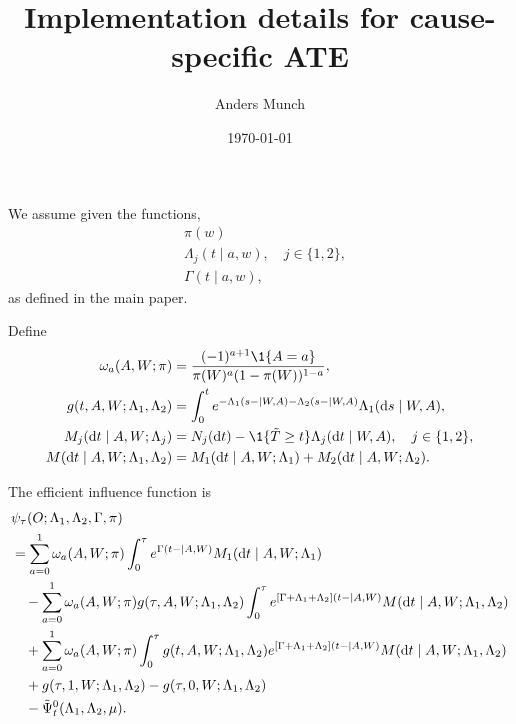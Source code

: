 \documentclass[a4,danish]{article}
\title{Implementation details for cause-specific ATE}
\author{Anders Munch}
\date{\today}
\begin{document}
\maketitle

We assume given the functions,
\begin{align*}
  & \pi(w)
  \\
  & \Lambda_j(t \mid a, w), \quad j \in \{1,2\},
  \\
  & \Gamma(t \mid a, w),
\end{align*}
as defined in the main paper.

Define
\begin{align*}
  \omega_a(A,W; \pi)
  &=  \frac{(-1)^{a+1}\1{\{A=a\}}}{\pi(W)^{a}(1-\pi(W))^{1-a}},
  \\
  g(t, A, W; \Lambda_1, \Lambda_2)
  & = \int_0^{t}
    e^{-\Lambda_1(s- \mid W, A)-\Lambda_2(s- \mid W, A)}  \Lambda_1(\diff s \mid
    W, A),
  \\  
  M_j(\diff t \mid A, W;  \Lambda_j  )
  & = N_j(\diff t) -
    \1{\{\tilde{T} \geq t\}} \Lambda_j(\diff t \mid W, A),
    \quad j \in \{1,2\},
  \\
  M(\diff t \mid A, W;  \Lambda_1, \Lambda_2  )
  & = M_1(\diff t \mid A, W;  \Lambda_1  ) +
    M_2(\diff t \mid A, W;  \Lambda_2  ).
\end{align*}

The efficient influence function is
\begin{equation*}
  \begin{split}
    & \psi_{\tau}(O; \Lambda_1, \Lambda_2, \Gamma, \pi)
    \\
    & =
      \sum_{a=0}^{1}
      \omega_a(A,W; \pi)
      \int_0^{\tau} e^{\Gamma(t- \mid A, W)}   
      M_1(\mathop{}\!\mathrm{d} t \mid A, W; \Lambda_1)
    \\
    & \quad
      - \sum_{a=0}^{1}
      \omega_a(A,W; \pi)
      g(\tau, A, W; \Lambda_1, \Lambda_2)
      \int_0^{\tau} e^{[\Gamma+\Lambda_1 + \Lambda_2](t- \mid A, W)}
      M(\mathop{}\!\mathrm{d} t \mid A, W; \Lambda_1, \Lambda_2)
    \\
    & \quad
      + \sum_{a=0}^{1}
      \omega_a(A,W; \pi)      
      \int_0^{\tau}
      g(t, A, W; \Lambda_1, \Lambda_2)
      e^{[\Gamma+\Lambda_1 + \Lambda_2](t- \mid A, W)}
      M(\mathop{}\!\mathrm{d} t \mid A, W; \Lambda_1, \Lambda_2)
    \\
    & \quad + g(\tau, 1, W; \Lambda_1, \Lambda_2)
      - g(\tau, 0, W; \Lambda_1, \Lambda_2)
    \\
    & \quad
      -\tilde{\Psi}_{t}^0(\Lambda_1, \Lambda_2, \mu).
  \end{split}
\end{equation*}
\end{document}
